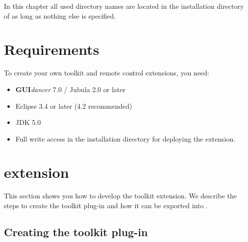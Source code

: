 In this chapter all used directory names are located in the
installation directory of \app{} as long as nothing else is specified.

\section{Requirements}
To create your own \ite{} toolkit and remote control extensions, you need:
\begin{itemize}
\item \textbf{GUI}\emph{dancer} 7.0 / Jubula 2.0 or later
\item Eclipse 3.4 or later (4.2 recommended)
\item JDK 5.0
\item Full write access in the \app{} installation directory for deploying the
extension.
\end{itemize}

\section{\ite{} extension}
\label{iteExtension}

This section shows you how to develop the \ite{} toolkit extension. We describe the
steps to create the toolkit plug-in and how it can be exported into \app{}.

\subsection{Creating the toolkit plug-in}

